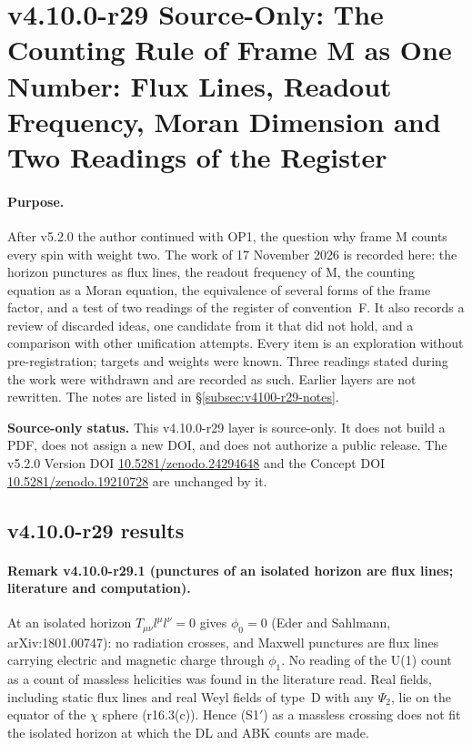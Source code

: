 \clearpage
\section*{v4.10.0-r29 Source-Only: The Counting Rule of Frame M as One Number: Flux Lines, Readout Frequency, Moran Dimension and Two Readings of the Register}
\label{sec:v4100-r29-one-number}

\paragraph{Purpose.}
After v5.2.0 the author continued with OP1, the question why frame M counts every spin with weight two.  The work of 17 November 2026 is recorded here:
the horizon punctures as flux lines, the readout frequency of M, the counting equation as a Moran equation, the equivalence of several forms of the
frame factor, and a test of two readings of the register of convention~F.  It also records a review of discarded ideas, one candidate from it that
did not hold, and a comparison with other unification attempts.  Every item is an exploration without pre-registration; targets and weights were
known.  Three readings stated during the work were withdrawn and are recorded as such.  Earlier layers are not rewritten.  The notes are listed in
\S\ref{subsec:v4100-r29-notes}.

\noindent\textbf{Source-only status.}
This v4.10.0-r29 layer is source-only.  It does not build a PDF, does not assign a new DOI,
and does not authorize a public release.  The v5.2.0 Version DOI
\href{https://doi.org/10.5281/zenodo.24294648}{10.5281/zenodo.24294648} and the Concept DOI
\href{https://doi.org/10.5281/zenodo.19210728}{10.5281/zenodo.19210728} are unchanged by it.

\subsection*{v4.10.0-r29 results}
\label{subsec:v4100-r29-results}

\paragraph{Remark v4.10.0-r29.1 (punctures of an isolated horizon are flux lines; literature and computation).}
At an isolated horizon \(T_{\mu\nu}l^\mu l^\nu=0\) gives \(\phi_0=0\) (Eder and Sahlmann, arXiv:1801.00747): no radiation crosses, and Maxwell punctures
are flux lines carrying electric and magnetic charge through \(\phi_1\).  No reading of the U(1) count as a count of massless helicities was found in
the literature read.  Real fields, including static flux lines and real Weyl fields of type~D with any \(\Psi_2\), lie on the equator of the \(\chi\)
sphere (r16.3(c)).  Hence (S1\('\)) as a massless crossing does not fit the isolated horizon at which the DL and ABK counts are made.

